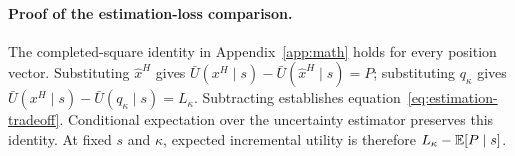 \paragraph{Proof of the estimation-loss comparison.}
The completed-square identity in Appendix~\ref{app:math} holds for every position vector. Substituting $\widehat x^H$ gives $\bar U(x^H\mid s)-\bar U(\widehat x^H\mid s)=P$; substituting $q_\kappa$ gives $\bar U(x^H\mid s)-\bar U(q_\kappa\mid s)=L_\kappa$. Subtracting establishes equation~\eqref{eq:estimation-tradeoff}. Conditional expectation over the uncertainty estimator preserves this identity. At fixed $s$ and $\kappa$, expected incremental utility is therefore $L_\kappa-\mathbb{E}[P\mid s]$.

